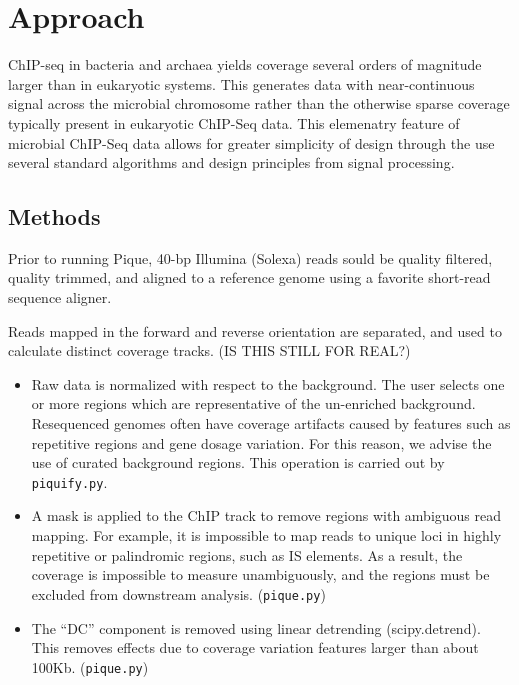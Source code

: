 \documentclass{bioinfo} %
\begin{document}
{\section{Approach} ChIP-seq in bacteria and archaea yields coverage
several orders of magnitude larger than in eukaryotic systems.  This
generates data with near-continuous signal across the microbial
chromosome rather than the otherwise sparse coverage typically present
in eukaryotic ChIP-Seq data.  This elemenatry feature of microbial
ChIP-Seq data allows for greater simplicity of design through the use
several standard algorithms and design principles from signal
processing.


\begin{methods} \section{Methods}

Prior to running Pique, 40-bp Illumina (Solexa) reads sould be quality
filtered, quality trimmed, and aligned to a reference genome using a
favorite short-read sequence aligner.

Reads mapped in the forward and reverse orientation are separated, and
used to calculate distinct coverage tracks. (IS THIS STILL FOR REAL?)

\begin{itemize}

\item Raw data is normalized with respect to the background. The user
selects one or more regions which are representative of the un-enriched
background. Resequenced genomes often have coverage artifacts caused by
features such as repetitive regions and gene dosage variation. For this
reason, we advise the use of curated background regions. This operation
is carried out by \texttt{piquify.py}.

\item A mask is applied to the ChIP track to remove regions with
ambiguous read mapping. For example, it is impossible to map reads to
unique loci in highly repetitive or palindromic regions, such as IS
elements. As a result, the coverage is impossible to measure
unambiguously, and the regions must be excluded from downstream
analysis. (\texttt{pique.py})

\item The ``DC'' component is removed using linear detrending
(scipy.detrend). This removes effects due to coverage variation features
larger than about 100Kb. (\texttt{pique.py})


\end{itemize}
\end{methods}}
\end{document}
